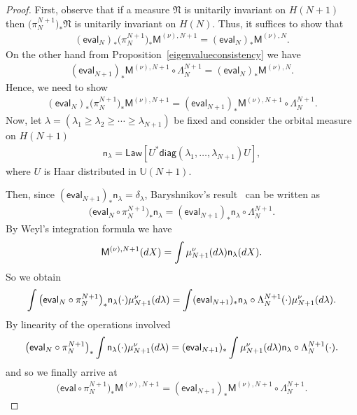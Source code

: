 \documentclass[11pt]{article}
\numberwithin{equation}{section}
\begin{document}
\begin{proof}First, observe that if a measure $\mathfrak{N}$ is unitarily invariant on $H(N+1)$ then $\big(\pi_{N}^{N+1}\big)_*\mathfrak{N}$ is unitarily invariant on $H(N)$. Thus, it suffices to show that
\begin{gather*}
 (\mathsf{eval}_N )_*\big(\pi_N^{N+1}\big)_*\mathsf{M}^{(\nu),N+1}= (\mathsf{eval}_N )_*\mathsf{M}^{(\nu),N}.
\end{gather*}
On the other hand from Proposition~\ref{eigenvalueconsistency} we have
\begin{gather*}
\left(\mathsf{eval}_{N+1}\right)_*\mathsf{M}^{(\nu),N+1}\circ \Lambda_N^{N+1}=\left(\mathsf{eval}_N\right)_*\mathsf{M}^{(\nu),N}.
\end{gather*}
Hence, we need to show
\begin{gather*}
 (\mathsf{eval}_N )_*\big(\pi_N^{N+1}\big)_*\mathsf{M}^{(\nu),N+1}= (\mathsf{eval}_{N+1} )_*\mathsf{M}^{(\nu),N+1}\circ \Lambda_N^{N+1}.
\end{gather*}
Now, let $\lambda=(\lambda_1\ge \lambda_2 \ge \cdots \ge \lambda_{N+1})$ be fixed and consider the orbital measure on $H(N+1)${\samepage
\begin{gather*}
\mathsf{n}_{\lambda}=\mathsf{Law} [U^*\mathsf{diag}(\lambda_1,\dots, \lambda_{N+1})U ],
\end{gather*}
where $U$ is Haar distributed in $\mathbb{U}(N+1)$.}

Then, since $ (\mathsf{eval}_{N+1} )_*\mathsf{n}_{\lambda}=\delta_{\lambda}$, Baryshnikov's result~\cite{Baryshnikov} can be written as
\begin{gather*}
\big(\mathsf{eval}_N\circ\pi_N^{N+1}\big)_*\mathsf{n}_{\lambda}= (\mathsf{eval}_{N+1} )_*\mathsf{n}_{\lambda}\circ \Lambda_N^{N+1}.
\end{gather*}
By Weyl's integration formula we have
\begin{gather*}
\mathsf{M}^{(\nu),N+1}({\rm d}X)=\int\mu_{N+1}^{\nu}({\rm d}\lambda)\mathsf{n}_{\lambda}({\rm d}X).
\end{gather*}
So we obtain
\begin{gather*}
\int \big(\mathsf{eval}_N\circ\pi_N^{N+1}\big)_*\mathsf{n}_{\lambda}(\cdot) \mu_{N+1}^{\nu}({\rm d}\lambda)= \int (\mathsf{eval}_{N+1} )_*\mathsf{n}_{\lambda}\circ \Lambda_N^{N+1}(\cdot) \mu_{N+1}^{\nu}({\rm d}\lambda).
\end{gather*}
By linearity of the operations involved
\begin{gather*}
\big(\mathsf{eval}_N\circ\pi_N^{N+1}\big)_*\int \mathsf{n}_{\lambda}(\cdot) \mu_{N+1}^{\nu}({\rm d}\lambda)= (\mathsf{eval}_{N+1} )_*\int \mu_{N+1}^{\nu}({\rm d}\lambda)\mathsf{n}_{\lambda}\circ \Lambda_N^{N+1}(\cdot) .
\end{gather*}
and so we finally arrive at
\begin{gather*}
\big(\mathsf{eval}\circ\pi_N^{N+1}\big)_*\mathsf{M}^{(\nu),N+1}= (\mathsf{eval}_{N+1} )_*\mathsf{M}^{(\nu),N+1}\circ \Lambda_N^{N+1}.\tag*{\qed}
\end{gather*}\renewcommand{\qed}{}
\end{proof}
\end{document}
